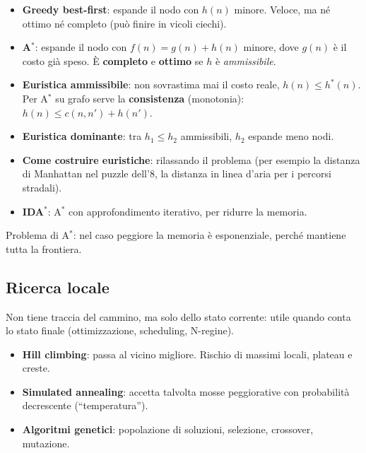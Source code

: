 \begin{itemize}
    \item \textbf{Greedy best-first}: espande il nodo con $h(n)$ minore. Veloce, ma né ottimo né completo (può finire in vicoli ciechi).
    \item \textbf{A$^*$}: espande il nodo con $f(n) = g(n) + h(n)$ minore, dove $g(n)$ è il costo già speso. È \textbf{completo} e \textbf{ottimo} se $h$ è \emph{ammissibile}.
    \item \textbf{Euristica ammissibile}: non sovrastima mai il costo reale, $h(n) \le h^*(n)$. Per A$^*$ su grafo serve la \textbf{consistenza} (monotonia): $h(n) \le c(n,n') + h(n')$.
    \item \textbf{Euristica dominante}: tra $h_1 \le h_2$ ammissibili, $h_2$ espande meno nodi.
    \item \textbf{Come costruire euristiche}: rilassando il problema (per esempio la distanza di Manhattan nel puzzle dell'8, la distanza in linea d'aria per i percorsi stradali).
    \item \textbf{IDA$^*$}: A$^*$ con approfondimento iterativo, per ridurre la memoria.
\end{itemize}

Problema di A$^*$: nel caso peggiore la memoria è esponenziale, perché mantiene tutta la frontiera.

\subsection{Ricerca locale}
Non tiene traccia del cammino, ma solo dello stato corrente: utile quando conta lo stato finale (ottimizzazione, scheduling, N-regine).
\begin{itemize}
    \item \textbf{Hill climbing}: passa al vicino migliore. Rischio di massimi locali, plateau e creste.
    \item \textbf{Simulated annealing}: accetta talvolta mosse peggiorative con probabilità decrescente (``temperatura'').
    \item \textbf{Algoritmi genetici}: popolazione di soluzioni, selezione, crossover, mutazione.
\end{itemize}

